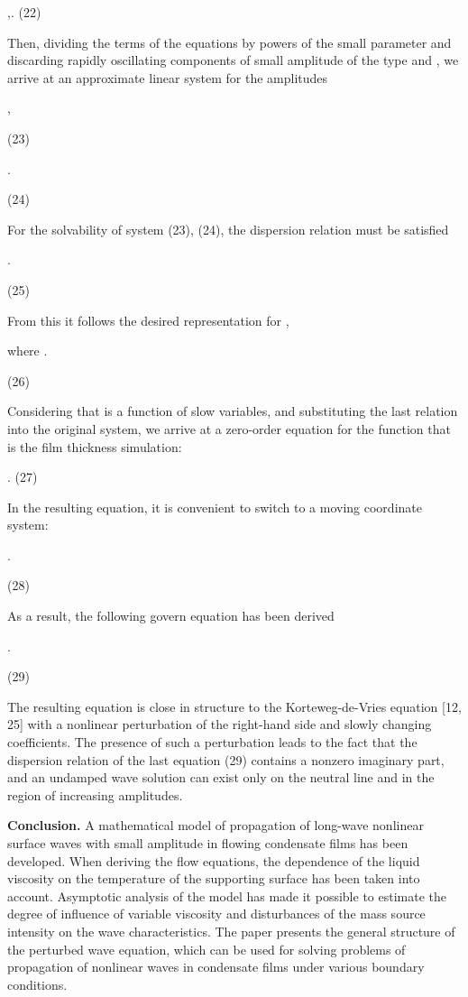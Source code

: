 \begin{multicols}{2}
,.
(22)

Then, dividing the terms of the equations by powers of the small
parameter and discarding rapidly oscillating components of small
amplitude of the type
and
, we arrive at an approximate linear system for the amplitudes

,

(23)

.

(24)

For the solvability of system (23), (24), the dispersion relation must
be satisfied

.

(25)

From this it follows the desired representation for
,

where
.

(26)

Considering
that
is a function of slow variables, and substituting the last relation into
the original system, we arrive at a zero-order equation for the function
that is the film thickness simulation:

.
(27)

In the resulting equation, it is convenient to switch to a moving
coordinate system:

.

(28)

As a result, the following govern equation has been derived

.

(29)

The resulting equation is close in structure to the Korteweg-de-Vries
equation {[}12, 25{]} with a nonlinear perturbation of the right-hand
side and slowly changing coefficients. The presence of such a
perturbation leads to the fact that the dispersion relation of the last
equation (29) contains a nonzero imaginary part, and an undamped wave
solution can exist only on the neutral line and in the region of
increasing amplitudes.

{\bfseries Conclusion.} A mathematical model of propagation of long-wave
nonlinear surface waves with small amplitude in flowing condensate films
has been developed. When deriving the flow equations, the dependence of
the liquid viscosity on the temperature of the supporting surface has
been taken into account. Asymptotic analysis of the model has made it
possible to estimate the degree of influence of variable viscosity and
disturbances of the mass source intensity on the wave characteristics.
The paper presents the general structure of the perturbed wave equation,
which can be used for solving problems of propagation of nonlinear waves
in condensate films under various boundary conditions.
\end{multicols}

